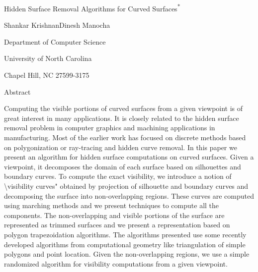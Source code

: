 \documentclass[11pt,letterpaper]{article}
\begin{document}
\thispagestyle{fancy}
\vspace*{0.6in}
\begin{center}
{\fontsize{20}{22}\selectfont Hidden Surface Removal Algorithms for Curved Surfaces\textsuperscript{*}\par}
\vspace{0.22in}
{\fontsize{12}{14}\selectfont Shankar Krishnan\hspace*{1in}Dinesh Manocha\par}
\vspace{0.34in}
{\fontsize{12}{12}\selectfont Department of Computer Science\par}
{\fontsize{12}{12}\selectfont University of North Carolina\par}
{\fontsize{12}{12}\selectfont Chapel Hill, NC 27599-3175\par}
\vspace{0.18in}
{\fontsize{16}{18}\selectfont Abstract\par}
\end{center}
\vspace{0.16in}
\begingroup
\parindent=0.25in
{\fontsize{11}{15}\selectfont Computing the visible portions of curved surfaces from a given viewpoint is of great interest in many applications. It is closely related to the hidden surface removal problem in computer graphics and machining applications in manufacturing. Most of the earlier work has focused on discrete methods based on polygonization or ray-tracing and hidden curve removal. In this paper we present an algorithm for hidden surface computations on curved surfaces. Given a viewpoint, it decomposes the domain of each surface based on silhouettes and boundary curves. To compute the exact visibility, we introduce a notion of \textbackslash{}visibility curves" obtained by projection of silhouette and boundary curves and decomposing the surface into non-overlapping regions. These curves are computed using marching methods and we present techniques to compute all the components. The non-overlapping and visible portions of the surface are represented as trimmed surfaces and we present a representation based on polygon trapezoidation algorithms. The algorithms presented use some recently developed algorithms from computational geometry like triangulation of simple polygons and point location. Given the non-overlapping regions, we use a simple randomized algorithm for visibility computations from a given viewpoint.\par}
\par
\end{document}
